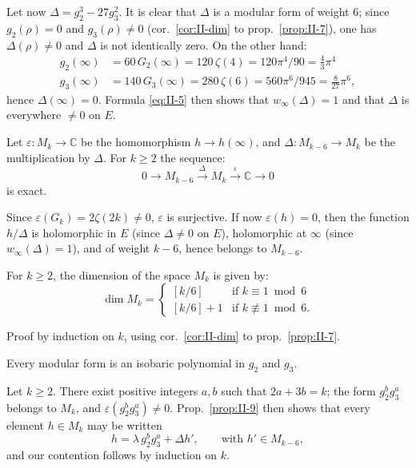 Let now $\Delta=g_{2}^{3}-27g_{3}^{2}$. It is clear that $\Delta$ is a
modular form of weight $6$; since $g_{2}(\rho)=0$ and $g_{3}(\rho)\neq 0$
(cor.~\ref{cor:II-dim} to prop.~\ref{prop:II-7}), one has
$\Delta(\rho)\neq 0$ and $\Delta$ is not identically zero. On the other
hand:
\[
\begin{aligned}
g_{2}(\infty)&=60\,G_{2}(\infty)=120\,\zeta(4)=120\pi^{4}/90=\tfrac{4}{3}\pi^{4}\\
g_{3}(\infty)&=140\,G_{3}(\infty)=280\,\zeta(6)=560\pi^{6}/945=\tfrac{8}{27}\pi^{6},
\end{aligned}
\]
hence $\Delta(\infty)=0$. Formula \eqref{eq:II-5} then shows that
$w_{\infty}(\Delta)=1$ and that $\Delta$ is everywhere $\neq 0$ on $E$.

\begin{proposition}\label{prop:II-9}
Let $\varepsilon:M_{k}\longrightarrow\mathbb{C}$ be the homomorphism
$h\longrightarrow h(\infty)$, and $\Delta:M_{k-6}\longrightarrow M_{k}$ be
the multiplication by $\Delta$. For $k\geq 2$ the sequence:
\[
0\rightarrow M_{k-6}\xrightarrow{\ \Delta\ }M_{k}
\xrightarrow{\ \varepsilon\ }\mathbb{C}\rightarrow 0
\]
is exact.
\end{proposition}

Since $\varepsilon(G_{k})=2\zeta(2k)\neq 0$, $\varepsilon$ is surjective.
If now $\varepsilon(h)=0$, then the function $h/\Delta$ is holomorphic in
$E$ (since $\Delta\neq 0$ on $E$), holomorphic at $\infty$ (since
$w_{\infty}(\Delta)=1$), and of weight $k-6$, hence belongs to $M_{k-6}$.

\begin{corollary}\label{cor:II-dimMk}
For $k\geq 2$, the dimension of the space $M_{k}$ is given by:
\[
\dim M_{k}=
\begin{cases}
[k/6] & \text{if } k\equiv 1\bmod 6\\
[k/6]+1 & \text{if } k\not\equiv 1\bmod 6.
\end{cases}
\]
\end{corollary}

Proof by induction on $k$, using cor.~\ref{cor:II-dim} to
prop.~\ref{prop:II-7}.

\begin{corollary}\label{cor:II-isobaric}
Every modular form is an isobaric polynomial in $g_{2}$ and $g_{3}$.
\end{corollary}

Let $k\geq 2$. There exist positive integers $a,b$ such that
$2a+3b=k$; the form $g_{2}^{b}g_{3}^{a}$ belongs to $M_{k}$, and
$\varepsilon(g_{2}^{b}g_{3}^{a})\neq 0$. Prop.~\ref{prop:II-9} then shows
that every element $h\in M_{k}$ may be written
\[
h=\lambda\,g_{2}^{b}g_{3}^{a}+\Delta h',\qquad\text{with }h'\in M_{k-6},
\]
and our contention follows by induction on $k$.

